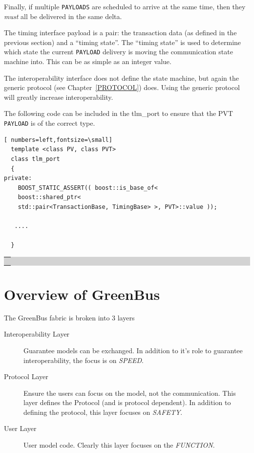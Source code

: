 \documentclass[12pt,oneside]{gsbook}
\def\example#1{\begin{center}\colorbox{lightgrey}{\begin{tabular}{|p{0.6\paperwidth}|}\hline\\#1\\ \\ \hline\end{tabular}}\end{center}}
\newenvironment{exampleenv}{\begin{lrbox}{\examplebox}\begin{minipage}{0.6\paperwidth}}{\end{minipage}\end{lrbox}\example{\usebox{\examplebox}}}
\begin{document}
Finally, if multiple {\tt PAYLOADS} are scheduled to arrive at the same
time, then they {\em must} all be delivered in the same delta. 

The timing interface payload is a pair: the transaction data (as
defined in the previous section) and a ``timing state''. The ``timing
state'' is used to determine which state the current {\tt PAYLOAD}
delivery  is moving the communication state machine into. This can be
as simple as an integer value.

The interoperability interface does not define the state machine, but again the
generic protocol (see Chapter~\ref{PROTOCOL}) does. Using the generic
protocol will greatly increase interoperability.

The following code can be included in the tlm\_port to ensure that the PVT
{\tt PAYLOAD} is of the correct type.

\begin{exampleenv}
\begin{Verbatim}[ numbers=left,fontsize=\small]
  template <class PV, class PVT>
  class tlm_port
  {
private:
    BOOST_STATIC_ASSERT(( boost::is_base_of<
	boost::shared_ptr<
	std::pair<TransactionBase, TimingBase> >, PVT>::value ));

   ....

  }
\end{Verbatim}
\end{exampleenv}



\chapter{Overview of GreenBus}

The GreenBus fabric is broken into 3 layers
\begin{description}
\item [Interoperability Layer]
Guarantee models can be exchanged. 
In addition to it's role to guarantee interoperability, the focus is
on {\em SPEED}.
\item [Protocol Layer]
Ensure the users can focus on the model, not the communication. This
layer defines the Protocol (and is protocol dependent). In addition to
defining the protocol, this layer focuses on {\em SAFETY}.
\item [User Layer] 
User model code. Clearly this layer focuses on the {\em FUNCTION}.
\end{description}
\end{document}
